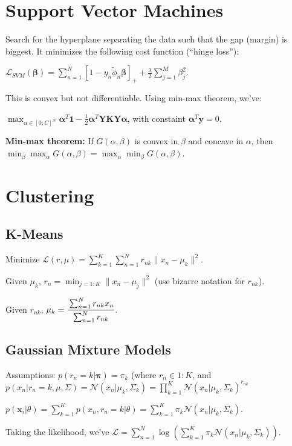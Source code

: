\documentclass[10pt,a4paper,landscape]{article}
\renewcommand{\bf}[1]{\ensuremath{\mathbf{#1}}}
\newcommand{\balpha}{\boldsymbol\alpha}
\newcommand{\bbeta}{\boldsymbol\beta}
\renewcommand{\vec}{\mathbf}
\begin{document}
\begin{multicols*}{4}
\section{Support Vector Machines}
Search for the hyperplane separating the data such that the gap (margin) is biggest.
It minimizes the following cost function (``hinge loss''):

$\mathcal{L}_{SVM} (\bbeta)= \sum_{n=1}^N [1 - y_n \tilde\phi_n \bbeta]_{+} + \frac{\lambda}{2} \sum_{j=1}^M \beta_j^2$.

This is convex but not differentiable. Using min-max theorem, we've:

$\max_{\alpha \in [0; C]^N} \balpha^T \bf{1} - \frac{1}{2} \balpha^T \bf{Y K Y} \balpha$, with constaint $\balpha^T \bf{y} = 0$.

\textbf{Min-max theorem:} If $G(\alpha, \beta)$ is convex in $\beta$ and concave in $\alpha$, then $\min_\beta\max_\alpha G(\alpha,\beta) = \max_\alpha\min_\beta G(\alpha,\beta)$.

\section{Clustering}
\subsection{K-Means}
Minimize $\mathcal{L}(r,\mu) = \sum_{k=1}^K\sum_{n=1}^N r_{nk}\|x_n-\mu_k\|^2$. 

Given $\mu_k$, $r_n = \min_{j=1:K}\|x_n-\mu_j\|^2$ (use bizarre notation for $r_{nk}$).

Given $r_{nk}$, $\mu_k = \cfrac{\sum_{n=1}^Nr_{nk}x_n}{\sum_{n=1}^Nr_{nk}}$.

\subsection{Gaussian Mixture Models}
Assumptions: $p(r_n = k | \vec{\pi}) = \pi_k$ (where $r_n \in 1:K$, and $p(x_n | r_n = k, \mu, \Sigma) = \mathcal{N}(x_n | \mu_k, \Sigma_k) = \prod_{k=1}^{K}\mathcal{N}(x_n | \mu_k, \Sigma_k)^{r_{nk}}$

$p(\bf{x}_i | \theta) = \sum_{k=1}^K p(x_n, r_n = k | \theta) = \sum_{k=1}^K\pi_k\mathcal{N}(x_n | \mu_k, \Sigma_k)$.

Taking the likelihood, we've $\mathcal{L} = \sum_{n=1}^N\log\left( \sum_{k=1}^K\pi_k\mathcal{N}(x_n | \mu_k, \Sigma_k) \right)$.


\end{multicols*}
\end{document}
